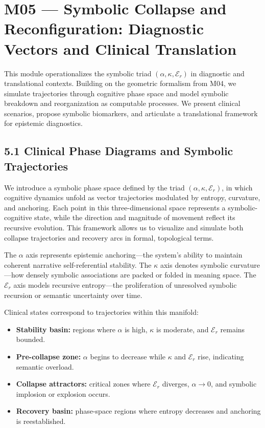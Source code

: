 \section*{M05 — Symbolic Collapse and Reconfiguration: Diagnostic Vectors and Clinical Translation}

This module operationalizes the symbolic triad $(\alpha, \kappa, \mathcal{E}_r)$ in diagnostic and translational contexts. Building on the geometric formalism from M04, we simulate trajectories through cognitive phase space and model symbolic breakdown and reorganization as computable processes. We present clinical scenarios, propose symbolic biomarkers, and articulate a translational framework for epistemic diagnostics.

\subsection*{5.1 Clinical Phase Diagrams and Symbolic Trajectories}

We introduce a symbolic phase space defined by the triad $(\alpha, \kappa, \mathcal{E}_r)$, in which cognitive dynamics unfold as vector trajectories modulated by entropy, curvature, and anchoring. Each point in this three-dimensional space represents a symbolic-cognitive state, while the direction and magnitude of movement reflect its recursive evolution. This framework allows us to visualize and simulate both collapse trajectories and recovery arcs in formal, topological terms.

The $\alpha$ axis represents epistemic anchoring—the system's ability to maintain coherent narrative self-referential stability. The $\kappa$ axis denotes symbolic curvature—how densely symbolic associations are packed or folded in meaning space. The $\mathcal{E}_r$ axis models recursive entropy—the proliferation of unresolved symbolic recursion or semantic uncertainty over time.

Clinical states correspond to trajectories within this manifold:

\begin{itemize}
  \item \textbf{Stability basin:} regions where $\alpha$ is high, $\kappa$ is moderate, and $\mathcal{E}_r$ remains bounded.
  \item \textbf{Pre-collapse zone:} $\alpha$ begins to decrease while $\kappa$ and $\mathcal{E}_r$ rise, indicating semantic overload.
  \item \textbf{Collapse attractors:} critical zones where $\mathcal{E}_r$ diverges, $\alpha \to 0$, and symbolic implosion or explosion occurs.
  \item \textbf{Recovery basin:} phase-space regions where entropy decreases and anchoring is reestablished.
\end{itemize}

